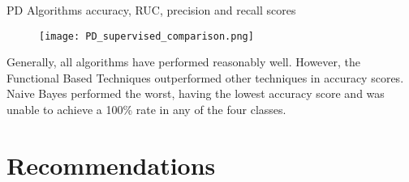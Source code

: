 \bigskip
\begin{table}[h]
    \caption{PD Algorithms accuracy, RUC, precision and recall scores \cite{8300383}}
    \begin{figure}[H]
        \texttt{[image: PD\_supervised\_comparison.png]}
        \centering
    \end{figure}
    \label{fig:PD_table}
\end{table}

Generally, all algorithms have performed reasonably well. However, the Functional Based Techniques outperformed other techniques in accuracy scores. 
Naive Bayes performed the worst, having the lowest accuracy score and was unable to achieve a 100\% rate in any of the four classes.


\section{Recommendations}
